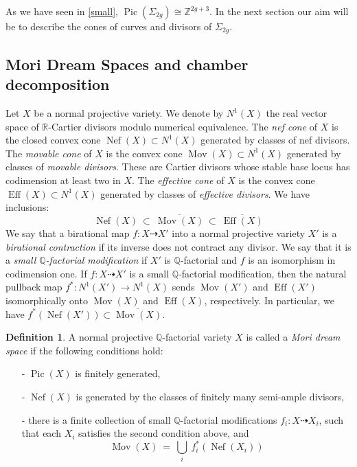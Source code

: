 \documentclass[a4paper,10pt]{amsart}
\theoremstyle{definition}
\newtheorem{Definition}[thm]{Definition}
\DeclareMathOperator{\Pic}{Pic}
\DeclareMathOperator{\Eff}{Eff}
\DeclareMathOperator{\Nef}{Nef}
\DeclareMathOperator{\Mov}{Mov}
\begin{document}
As we have seen in \ref{small}, $\Pic(\Sigma_{2g})\cong \mathbb{Z}^{2g+3}$. In the next section our aim will be to describe the cones of curves and divisors of $\Sigma_{2g}$. 

\subsection{Mori Dream Spaces and chamber decomposition}\label{MDS}
Let $X$ be a normal projective variety. 
We denote by $N^1(X)$ the real vector space of $\mathbb{R}$-Cartier divisors modulo numerical equivalence. 
The \emph{nef cone} of $X$ is the closed convex cone $\Nef(X)\subset N^1(X)$ generated by classes of 
nef divisors. 
The \emph{movable cone} of $X$ is the convex cone $\Mov(X)\subset N^1(X)$ generated by classes of 
\emph{movable divisors}. These are Cartier divisors whose stable base locus has codimension at least two in $X$.
The \emph{effective cone} of $X$ is the convex cone $\Eff(X)\subset N^1(X)$ generated by classes of 
\emph{effective divisors}.
We have inclusions:
$$
\Nef(X)\ \subset \ \overline{\Mov(X)}\ \subset \ \overline{\Eff(X)}
$$
We say that a birational map  $f: X \dasharrow X'$ into a normal projective variety $X'$  is a \emph{birational contraction} if its
inverse does not contract any divisor. 
We say that it is a \emph{small $\mathbb{Q}$-factorial modification} 
if $X'$ is $\mathbb{Q}$-factorial  and $f$ is an isomorphism in codimension one.
If  $f: X \dasharrow X'$ is a small $\mathbb{Q}$-factorial modification, then 
the natural pullback map $f^*:N^1(X')\to N^1(X)$ sends $\Mov(X')$ and $\Eff(X')$
isomorphically onto $\Mov(X)$ and $\Eff(X)$, respectively.
In particular, we have $f^*(\Nef(X'))\subset \overline{\Mov(X)}$.

\begin{Definition}\label{def:MDS} 
A normal projective $\mathbb{Q}$-factorial variety $X$ is called a \emph{Mori dream space}
if the following conditions hold:
\begin{enumerate}
\item[-] $\Pic{(X)}$ is finitely generated,
\item[-] $\Nef{(X)}$ is generated by the classes of finitely many semi-ample divisors,
\item[-] there is a finite collection of small $\mathbb{Q}$-factorial modifications
 $f_i: X \dasharrow X_i$, such that each $X_i$ satisfies the second condition above, and 
 $$
 \Mov{(X)} \ = \ \bigcup_i \  f_i^*(\Nef{(X_i)})
 $$
\end{enumerate}
\end{Definition}
\end{document}
